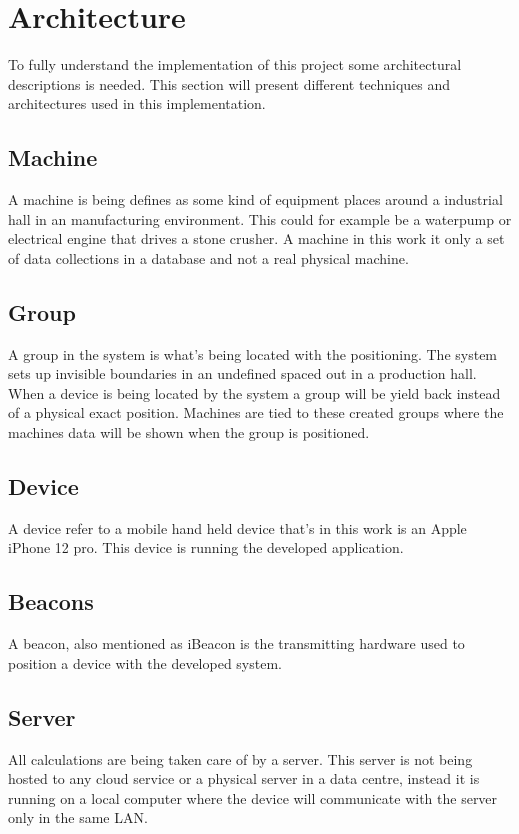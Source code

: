 \section{Architecture}\label{sec:implArchitecture}
To fully understand the implementation of this project some architectural descriptions is needed.
This section will present different techniques and architectures used in this implementation.


\subsection{Machine}\label{sec:implArchitectureMachine}
A machine is being defines as some kind of equipment places around a industrial hall in an manufacturing environment.
This could for example be a waterpump or electrical engine that drives a stone crusher.
A machine in this work it only a set of data collections in a database and not a real physical machine.


\subsection{Group}\label{sec:implArchitectureGroup}
A group in the system is what's being located with the positioning.
The system sets up invisible boundaries in an undefined spaced out in a production hall.
When a device is being located by the system a group will be yield back instead of a physical exact position.
Machines are tied to these created groups where the machines data will be shown when the group is positioned.


\subsection{Device}\label{sec:implArchitectureDevice}
A device refer to a mobile hand held device that's in this work is an Apple iPhone 12 pro.
This device is running the developed application.


\subsection{Beacons}\label{sec:implArchitectureBeacons}
A beacon, also mentioned as iBeacon is the transmitting hardware used to position a device with the developed system.


\subsection{Server}\label{sec:implArchitectureServer}
All calculations are being taken care of by a server.
This server is not being hosted to any cloud service or a physical server in a data centre, instead it is running on a local computer where the device will communicate with the server only in the same LAN.


